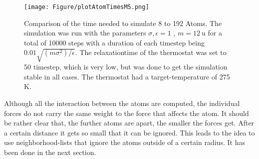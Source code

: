 \begin{figure}
	\begin{center}
		\texttt{[image: Figure/plotAtomTimesM5.png]}
	\end{center}
	\caption[Comparison of the time needed to simulate 8 to 192 Atoms]{Comparison of the time needed to simulate 8 to 192 Atoms. The simulation was run with the parameters $\sigma, \epsilon = 1$ , $m = 12~\mathrm{u}$ for a total of 10000 steps with a duration of each $\mathrm{timestep}$ being $0.01\sqrt{(m\sigma^2)/\epsilon} $. The relaxationtime of the thermostat was set to 50 $\mathrm{timestep} $, which is very low, but was done to get the simulation stable in all cases. The thermostat had a target-temperature of 275 K.} 
	\label{PlotSimulationTimeBerendsenThermostat}
\end{figure}

Although all the interaction between the atoms are computed, the individual forces do not carry the same weight to the force that affects the atom. It should be rather clear that, the further atoms are apart, the smaller the forces get. After a certain distance it gets so small that it can be ignored. This leads to the idea to use neighborhood-lists that ignore the atoms outside of a certain radius. It has been done in the next section.

